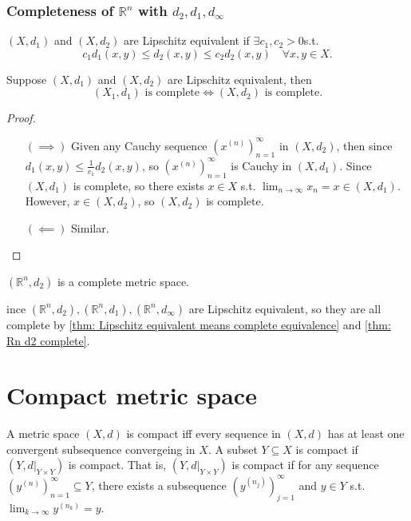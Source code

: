 \subsubsection{Completeness of \(\mathbb{R}^n\) with \(d_2, d_1, d_\infty \) }
\begin{prev}
    \((X, d_1)\) and \((X, d_2)\) are Lipschitz equivalent if \(\exists c_1, c_2 > 0\)s.t. 
    \[
        c_1 d_1(x, y) \le d_2(x, y) \le c_2 d_2(x, y) \quad \forall x, y \in X. 
    \]   
\end{prev}

\begin{theorem} \label{thm: Lipschitz equivalent means complete equivalence}
    Suppose \((X, d_1)\) and \((X, d_2)\) are Lipschitz equivalent, then 
    \[
        (X_1, d_1) \text{ is complete} \iff (X, d_2) \text{ is complete}.
    \]  
\end{theorem}
\begin{proof}
    \vphantom{text}
    \begin{itemize}
        \item [\((\implies )\)] Given any Cauchy sequence \(\left( x^{(n)} \right)_{n=1}^{\infty}  \) in \((X, d_2)\), then since \(d_1(x, y) \le \frac{1}{c_1} d_2(x, y)\), so \(\left( x^{(n)} \right)_{n=1}^{\infty}  \) is Cauchy in \((X, d_1)\). Since \((X, d_1)\) is complete, so there exists \(x \in X\) s.t. \(\lim_{n \to \infty} x_n = x \in (X, d_1)\). However, \(x \in (X, d_2)\), so \((X, d_2)\) is complete. 
        \item [\((\impliedby )\)] Similar.         
    \end{itemize}
\end{proof}

\begin{theorem} \label{thm: Rn d2 complete}
    \(\left( \mathbb{R} ^n, d_2 \right) \) is a complete metric space. 
\end{theorem}

\begin{corollary}
    ince \(\left( \mathbb{R}^n , d_2\right), \left( \mathbb{R} ^n, d_1 \right), \left( \mathbb{R} ^n, d_\infty  \right)   \) are Lipschitz equivalent, so they are all complete by \autoref{thm: Lipschitz equivalent means complete equivalence} and \autoref{thm: Rn d2 complete}.
\end{corollary}

\section{Compact metric space}
\begin{definition} \label{def: compect}
    A metric space \((X, d)\) is compact iff every sequence in \((X, d)\) has at least one convergent subsequence convergeing in \(X\). A subset \(Y \subseteq X\) is compact if \(\left( Y, d\vert_{Y \times Y} \right) \) is compact. That is, \(\left( Y, d\vert_{Y \times Y} \right) \) is compact if for any sequence \(\left( y^{(n)} \right)_{n=1}^{\infty } \subseteq  Y \), there exists a subsequence \(\left( y^{(n_j)} \right)_{j=1}^{\infty}  \) and \(y \in Y\)  s.t. \(\lim_{k \to \infty} y^{(n_k)} = y. \)     
\end{definition}

